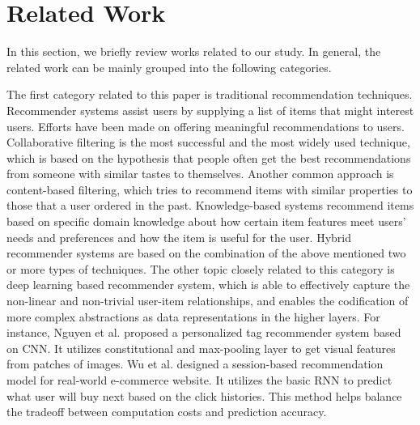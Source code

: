 \section{Related Work}
\label{sec:related_work}

In this section, we briefly review works related to our study. In general, the related work can be mainly grouped into the following categories.

The first category related to this paper is traditional recommendation techniques. Recommender systems assist users by supplying a list of items that might interest users. Efforts have been made on offering meaningful recommendations to users. Collaborative filtering\cite{linden2003amazon} is the most successful and the most widely used technique, which is based on the hypothesis that people often get the best recommendations from someone with similar tastes to themselves\cite{breese1998empirical}. Another common approach is content-based filtering\cite{mooney2000content}, which tries to recommend items with similar properties to those that a user ordered in the past. Knowledge-based systems\cite{akerkar2010knowledge} recommend items based on specific domain knowledge about how certain item features meet users’ needs and preferences and how the item is useful for the user. Hybrid recommender systems are based on the combination of the above mentioned two or more types of techniques\cite{burke2002hybrid}. The other topic closely related to this category is deep learning based recommender system, which is able to effectively capture the non-linear and non-trivial user-item relationships, and enables the codification of more complex abstractions as data representations in the higher layers\cite{zhang2017deep}. For instance, Nguyen et al.\cite{nguyen2017personalized} proposed a personalized tag recommender system based on CNN. It utilizes constitutional and max-pooling layer to get visual features from patches of images. Wu et al.\cite{wu2016personal} designed a session-based recommendation model for real-world e-commerce website. It utilizes the basic RNN to predict what user will buy next based on the click histories. This method helps balance the tradeoff between computation costs and prediction accuracy.

